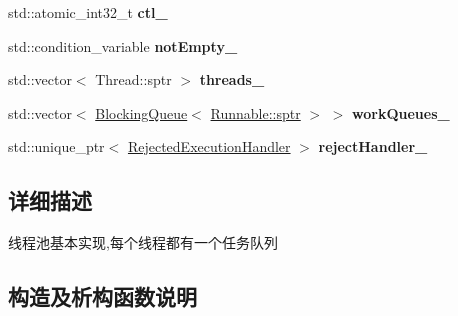 \begin{DoxyCompactItemize}
\mbox{\label{classThreadPoolExecutor_a010113b7aac17ef364d417c485263873}} 
std\+::atomic\+\_\+int32\+\_\+t {\bfseries ctl\+\_\+}
\item 
\mbox{\label{classThreadPoolExecutor_ad523af8548ca8f1dae80cb295ee567b3}} 
std\+::condition\+\_\+variable {\bfseries not\+Empty\+\_\+}
\item 
\mbox{\label{classThreadPoolExecutor_a47dd74330fa41d01067943b1db74818a}} 
std\+::vector$<$ Thread\+::sptr $>$ {\bfseries threads\+\_\+}
\item 
\mbox{\label{classThreadPoolExecutor_a415491f8f40c0fcb99e7ec25cdd209d0}} 
std\+::vector$<$ \hyperlink{classBlockingQueue}{Blocking\+Queue}$<$ \hyperlink{classRunnable_abe8d3066c7305401d6f0aad8e70780f2}{Runnable\+::sptr} $>$ $>$ {\bfseries work\+Queues\+\_\+}
\item 
\mbox{\label{classThreadPoolExecutor_a347041db412b03aa09dd4e9b3beaa391}} 
std\+::unique\+\_\+ptr$<$ \hyperlink{classRejectedExecutionHandler}{Rejected\+Execution\+Handler} $>$ {\bfseries reject\+Handler\+\_\+}
\end{DoxyCompactItemize}


\subsection{详细描述}
线程池基本实现,每个线程都有一个任务队列 

\subsection{构造及析构函数说明}
\mbox{\label{classThreadPoolExecutor_a212b34b7e25e9eba4e096473a1b81f9e}} 
